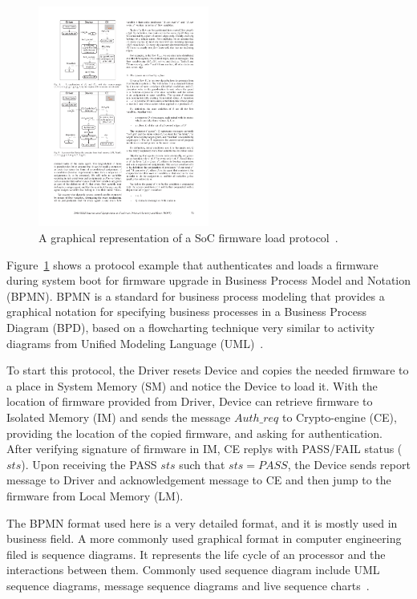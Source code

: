 \documentclass[12pt,frontmatter,copyright,thesis]{usfmanus}
\begin{document}
\begin{figure}[h]
\centering
\includegraphics[width=0.5\textwidth]{figures/bpmn-flow-ex}
\caption{A graphical representation of a SoC firmware load protocol~\cite{Krstic14HOST}.}
\label{flowa}
\end{figure}

Figure~\ref{flowa} shows a protocol example that
authenticates and loads a firmware during system boot for
firmware upgrade in Business Process Model and Notation (BPMN). 
BPMN is a standard for business process modeling that provides a graphical notation for
 specifying business processes in a Business Process Diagram (BPD),
 based on a flowcharting technique very similar to activity diagrams from Unified Modeling Language (UML)~\cite{white2004process}.
 
To start this protocol, the Driver resets Device and copies the needed
firmware to a place in System Memory (SM) and notice the Device to load it. With the location of firmware
provided from Driver, Device can retrieve firmware to Isolated Memory (IM) and sends the message $Auth\_req $
to Crypto-engine (CE), providing the location of the copied firmware, and asking for authentication. After verifying 
signature of firmware in IM, CE replys with 
PASS/FAIL status ($sts$). 
Upon receiving the PASS $sts$ such that $sts=PASS$, the Device sends report message to Driver and acknowledgement message
to CE and then jump to the firmware from Local Memory (LM).

The BPMN format used here is a very detailed format, and it is mostly
used in business field. 
A more commonly used graphical format in computer
engineering filed is sequence diagrams.
It represents the
 life cycle of an processor and the interactions between them.
Commonly used sequence diagram include UML sequence diagrams, message sequence 
diagrams and live sequence charts~\cite{lsctocpn}.
 
\end{document}
